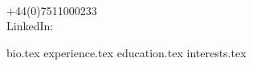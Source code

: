 \documentclass[a4paper, 11pt]{article}
\begin{document}
{ 
	\\+44(0)7511000233
	\\LinkedIn:  
}
 
{bio.tex}
{experience.tex}
{education.tex}
{interests.tex}

\end{document}
